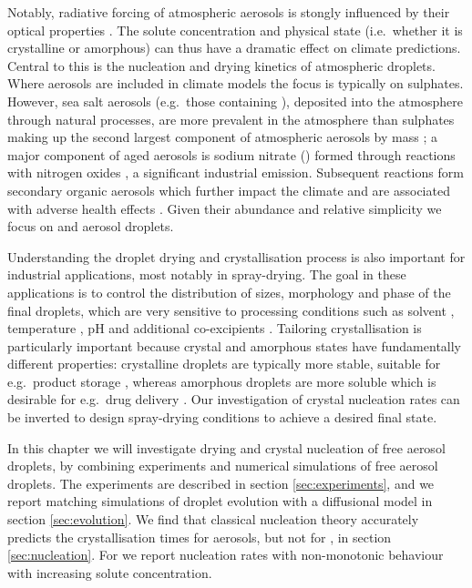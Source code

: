 \documentclass[11pt,twoside]{report}
\begin{document}
Notably, radiative forcing of atmospheric aerosols is stongly influenced by their optical properties \cite{HodasACP2015,CotterellACP2017}.
The solute concentration and physical state (i.e.\ whether it is crystalline or amorphous) can thus have a dramatic effect on climate predictions.
Central to this is the nucleation and drying kinetics of atmospheric droplets.
Where aerosols are included in climate models the focus is typically on sulphates.
However, sea salt aerosols (e.g.\ those containing ), deposited into the atmosphere through natural processes, are more prevalent in the atmosphere than sulphates making up the second largest component of atmospheric aerosols by mass \cite{KeeneJAS1998}; a major component of aged  aerosols is sodium nitrate () formed through reactions with nitrogen oxides \cite{TolockaJPCA2004}, a significant industrial emission.
Subsequent reactions form secondary organic aerosols which further impact the climate \cite{ScottACP2014,PoschlCR2015} and are associated with adverse health effects \cite{PoschlCR2015}.
Given their abundance and relative simplicity we focus on  and  aerosol droplets.

Understanding the droplet drying and crystallisation process is also important for industrial applications, most notably in spray-drying.
The goal in these applications is to control the distribution of sizes, morphology and phase of the final droplets, which are very sensitive to processing conditions such as solvent \cite{CarverIECR2012,LintingreSM2016}, temperature \cite{IveyAST2018,YouDT2014,LinPT2015}, pH \cite{YuJPS2002,DubbiniIJP2014} and additional co-excipients \cite{ZhongAP2018,NandiyantoAPT2011,LyuJCG2017}.
Tailoring crystallisation is particularly important because crystal and amorphous states have fundamentally different properties: crystalline droplets are typically more stable, suitable for e.g.\ product storage \cite{VehringJAS2007,CostantinoJPS1998}, whereas amorphous droplets are more soluble which is desirable for e.g.\ drug delivery \cite{AmstadJPCB2016,BroughIJP2013}.
Our investigation of crystal nucleation rates can be inverted to design spray-drying conditions to achieve a desired final state.

In this chapter we will investigate drying and crystal nucleation of free aerosol droplets, by combining experiments and numerical simulations of free aerosol droplets.
The experiments are described in section \ref{sec:experiments}, and we report matching simulations of droplet evolution with a diffusional model in section \ref{sec:evolution}.
We find that classical nucleation theory accurately predicts the crystallisation times for  aerosols, but not for , in section \ref{sec:nucleation}.
For  we report nucleation rates with non-monotonic behaviour with increasing solute concentration.
\end{document}
